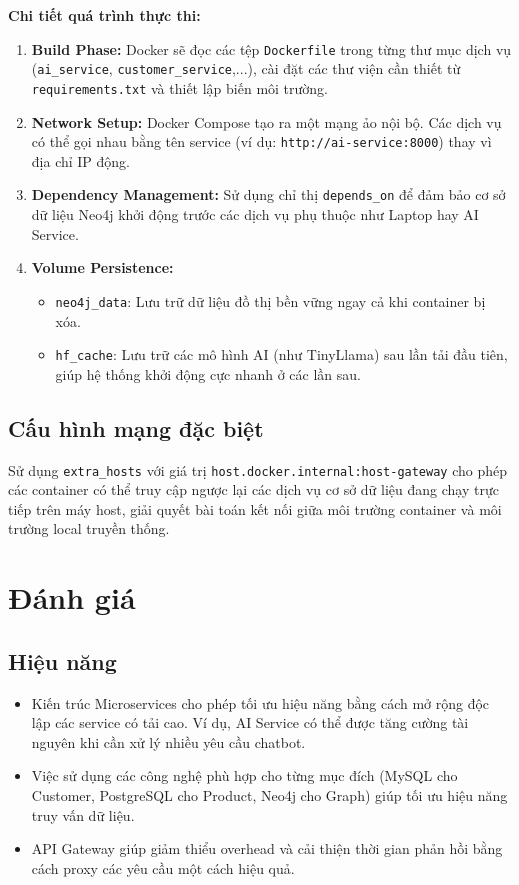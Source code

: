 \documentclass[12pt,a4paper]{report}
\begin{document}
\textbf{Chi tiết quá trình thực thi:}
\begin{enumerate}
    \item \textbf{Build Phase:} Docker sẽ đọc các tệp \texttt{Dockerfile} trong từng thư mục dịch vụ (\texttt{ai\_service}, \texttt{customer\_service},...), cài đặt các thư viện cần thiết từ \texttt{requirements.txt} và thiết lập biến môi trường.
    \item \textbf{Network Setup:} Docker Compose tạo ra một mạng ảo nội bộ. Các dịch vụ có thể gọi nhau bằng tên service (ví dụ: \texttt{http://ai-service:8000}) thay vì địa chỉ IP động.
    \item \textbf{Dependency Management:} Sử dụng chỉ thị \texttt{depends\_on} để đảm bảo cơ sở dữ liệu Neo4j khởi động trước các dịch vụ phụ thuộc như Laptop hay AI Service.
    \item \textbf{Volume Persistence:} 
    \begin{itemize}
        \item \texttt{neo4j\_data}: Lưu trữ dữ liệu đồ thị bền vững ngay cả khi container bị xóa.
        \item \texttt{hf\_cache}: Lưu trữ các mô hình AI (như TinyLlama) sau lần tải đầu tiên, giúp hệ thống khởi động cực nhanh ở các lần sau.
    \end{itemize}
\end{enumerate}

\subsection{Cấu hình mạng đặc biệt}
Sử dụng \texttt{extra\_hosts} với giá trị \texttt{host.docker.internal:host-gateway} cho phép các container có thể truy cập ngược lại các dịch vụ cơ sở dữ liệu đang chạy trực tiếp trên máy host, giải quyết bài toán kết nối giữa môi trường container và môi trường local truyền thống.

\section{Đánh giá}
\subsection{Hiệu năng}
\begin{itemize}
    \item Kiến trúc Microservices cho phép tối ưu hiệu năng bằng cách mở rộng độc lập các service có tải cao. Ví dụ, AI Service có thể được tăng cường tài nguyên khi cần xử lý nhiều yêu cầu chatbot.
    \item Việc sử dụng các công nghệ phù hợp cho từng mục đích (MySQL cho Customer, PostgreSQL cho Product, Neo4j cho Graph) giúp tối ưu hiệu năng truy vấn dữ liệu.
    \item API Gateway giúp giảm thiểu overhead và cải thiện thời gian phản hồi bằng cách proxy các yêu cầu một cách hiệu quả.
\end{itemize}
\end{document}
